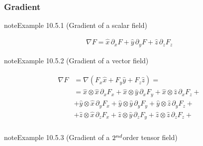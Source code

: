 \documentclass[letterpaper,10pt,english]{jupyterBook}
\begin{document}
\subsubsection{Gradient}
\label{\detokenize{ch/tensor-algebra-calculus/calculus-euclidean-cartesian:gradient}}\label{\detokenize{ch/tensor-algebra-calculus/calculus-euclidean-cartesian:tensor-calculus-cartesian-differential-operators-gradient}}

\label{ch/tensor-algebra-calculus/calculus-euclidean-cartesian:cartesian:gradient:scalar}
\begin{sphinxadmonition}{note}{Example 10.5.1 (Gradient of a scalar field)}


\begin{equation*}
\begin{split}\nabla F = \hat{x} \, \partial_x F + \hat{y} \, \partial_y F + \hat{z} \, \partial_z F_z\end{split}
\end{equation*}\end{sphinxadmonition}
\label{ch/tensor-algebra-calculus/calculus-euclidean-cartesian:example-1}
\begin{sphinxadmonition}{note}{Example 10.5.2 (Gradient of a vector field)}


\begin{equation*}
\begin{split}\begin{aligned}
\nabla F 
  & = \nabla (F_x \hat{x} + F_y \hat{y} + F_z \hat{z}) = \\
  & = \hat{x} \otimes \hat{x} \, \partial_x F_x + \hat{x} \otimes \hat{y} \, \partial_x F_y + \hat{x} \otimes \hat{z} \, \partial_x F_z + \\
  & + \hat{y} \otimes \hat{x} \, \partial_y F_x + \hat{y} \otimes \hat{y} \, \partial_y F_y + \hat{y} \otimes \hat{z} \, \partial_y F_z + \\
  & + \hat{z} \otimes \hat{x} \, \partial_z F_x + \hat{z} \otimes \hat{y} \, \partial_z F_y + \hat{z} \otimes \hat{z} \, \partial_z F_z + \\
\end{aligned}\end{split}
\end{equation*}\end{sphinxadmonition}
\label{ch/tensor-algebra-calculus/calculus-euclidean-cartesian:example-2}
\begin{sphinxadmonition}{note}{Example 10.5.3 (Gradient of a \protect\(2^{nd}\protect\)\sphinxhyphen{}order tensor field)}


\end{sphinxadmonition}
\end{document}
